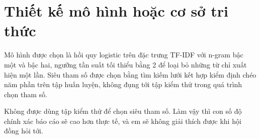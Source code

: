 \section{Thiết kế mô hình hoặc cơ sở tri thức}

\begin{chuy}
\end{chuy}

\begin{mau}
Mô hình được chọn là hồi quy logistic trên đặc trưng TF-IDF với n-gram bậc
một và bậc hai, ngưỡng tần suất tối thiểu  bằng 2 để loại bỏ
những từ chỉ xuất hiện một lần. Siêu tham số được chọn bằng tìm kiếm lưới
kết hợp kiểm định chéo năm phần trên tập huấn luyện, không đụng tới tập kiểm
thử trong quá trình chọn tham số.
\end{mau}

\begin{luuy}
Không được dùng tập kiểm thử để chọn siêu tham số. Làm vậy thì con số độ
chính xác báo cáo sẽ cao hơn thực tế, và em sẽ không giải thích được khi
hội đồng hỏi tới.
\end{luuy}

